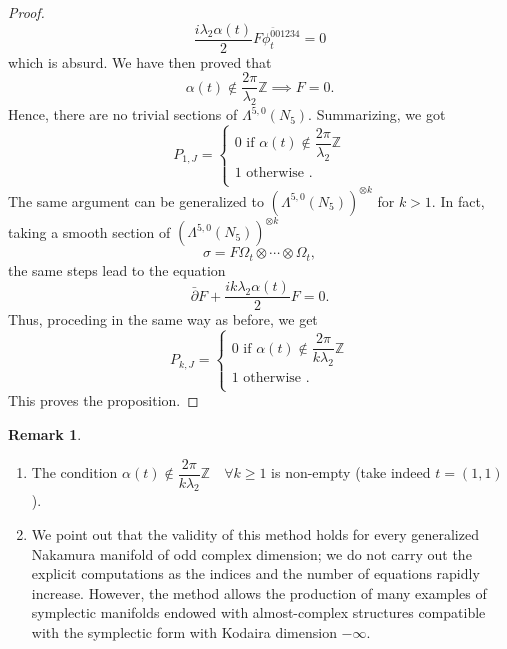\documentclass[a4paper, 11pt]{amsart}
\theoremstyle{plain}
\theoremstyle{definition}
\newtheorem{osservazione}{Remark}[section]
\newcommand{\delbar}{\bar{\partial}}
\numberwithin{equation}{section}
\begin{document}
\begin{proof}
	\[  \dfrac{i\lambda_{2}\alpha(t)}{2} F\phi_{t}^{\bar 0 01234} = 0  \]
	which is absurd. We have then proved that
	\[  \alpha(t) \notin  \dfrac{2\pi}{\lambda_{2}}\mathbb{Z} \implies F = 0. \]
	Hence, there are no trivial sections of $ \Lambda^{5,0}(N_{5}) $. Summarizing, we got
	\[ P_{1,J} = \begin{cases}
		0 \text{ if }  \alpha(t) \notin  \dfrac{2\pi}{\lambda_{2}}\mathbb{Z}  \\
		1 \text{ otherwise }. \\
	\end{cases} \]
	The same argument can be generalized to $( \Lambda^{5,0}(N_{5}) )^{\otimes k}$ for $ k > 1 $. In fact, taking a smooth section of $ ( \Lambda^{5,0}(N_{5}) )^{\otimes k} $
	\[ \sigma = F\Omega_{t} \otimes \cdots \otimes \Omega_{t},\]
	the same steps lead to the equation
	\[ \delbar F + \dfrac{ik\lambda_{2}\alpha(t)}{2}F = 0. \]
	Thus, proceding in the same way as before, we get
	\[ P_{k,J} = \begin{cases}
		0 \text{ if }  \alpha(t) \notin  \dfrac{2\pi}{k\lambda_{2}}\mathbb{Z} \\
		1 \text{ otherwise }. \\
	\end{cases}  \]
	This proves the proposition.
\end{proof}

\begin{osservazione}
	\begin{enumerate}
		\item The condition $ \alpha(t) \notin \dfrac{2\pi}{k\lambda_{2}}\mathbb{Z} \quad \forall k \ge 1 $ is non-empty (take indeed $ t = (1,1) $).
		\item We point out that the validity of this method holds for every generalized Nakamura manifold of odd complex dimension; we do not carry out the explicit computations as the indices and the number of equations rapidly increase. However, the method allows the production of many examples of symplectic manifolds endowed with almost-complex structures compatible with the symplectic form with Kodaira dimension $ -\infty $.
	\end{enumerate}
\end{osservazione}
\end{document}
